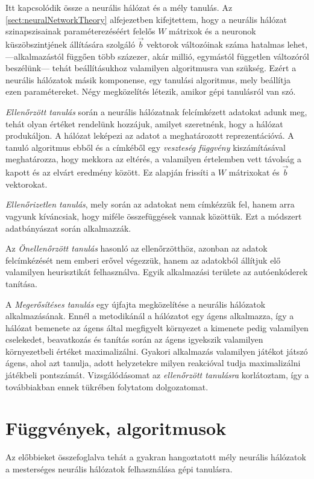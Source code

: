 Itt kapcsolódik össze a neurális hálózat és a mély tanulás. Az \ref{sect:neuralNetworkTheory} alfejezetben kifejtettem, hogy a neurális hálózat szinapszisainak paraméterezéséért felelős $W$ mátrixok és a neuronok küszöbszintjének állítására szolgáló $\vec{b}$ vektorok változóinak száma hatalmas lehet, ---alkalmazástól függően több százezer, akár millió, egymástól független változóról beszélünk--- tehát beállításukhoz valamilyen algoritmusra van szükség. Ezért a neurális hálózatok másik komponense, egy tanulási algoritmus, mely beállítja ezen paramétereket. Négy  megközelítés létezik, amikor gépi tanulásról van szó.

\emph{Ellenőrzött tanulás} során a neurális hálózatnak felcímkézett adatokat adunk meg, tehát olyan értéket rendelünk hozzájuk, amilyet szeretnénk, hogy a hálózat produkáljon. A hálózat leképezi az adatot a meghatározott reprezentációvá. A tanuló algoritmus ebből és a címkéből egy \emph{veszteség függvény} kiszámításával meghatározza, hogy mekkora az eltérés, a valamilyen értelemben vett távolság a kapott és az elvárt eredmény között. Ez alapján frissíti a $W$ mátrixokat és $\vec{b}$ vektorokat.

\emph{Ellenőrizetlen tanulás}, mely során az adatokat nem címkézzük fel, hanem arra vagyunk kíváncsiak, hogy miféle összefüggések vannak közöttük. Ezt a módszert adatbányászat során alkalmazzák. 

Az \emph{Önellenőrzött tanulás} hasonló az ellenőrzötthöz, azonban az adatok felcímkézését nem emberi erővel végezzük, hanem az adatokból állítjuk elő valamilyen heurisztikát felhasználva. Egyik alkalmazási területe az autóenkóderek tanítása.

A \emph{Megerősítéses tanulás} egy újfajta megközelítése a neurális hálózatok alkalmazásának. Ennél a metodikánál a hálózatot egy ágens alkalmazza, így a hálózat bemenete az ágens által megfigyelt környezet a kimenete pedig valamilyen cselekedet, beavatkozás és tanítás során az ágens igyekszik valamilyen környezetbeli értéket maximalizálni. Gyakori alkalmazás valamilyen játékot játszó ágens, ahol azt tanulja, adott helyzetekre milyen reakcióval tudja maximalizálni játékbeli pontszámát.
Vizsgálódásomat az \emph{ellenőrzött tanulásra} korlátoztam, így a továbbiakban ennek tükrében folytatom dolgozatomat.

\section{Függvények, algoritmusok}\label{sec:fuggvenyek-algoritmusok}
Az előbbieket összefoglalva tehát a gyakran hangoztatott mély neurális hálózatok a mesterséges neurális hálózatok felhasználása gépi tanulásra.


